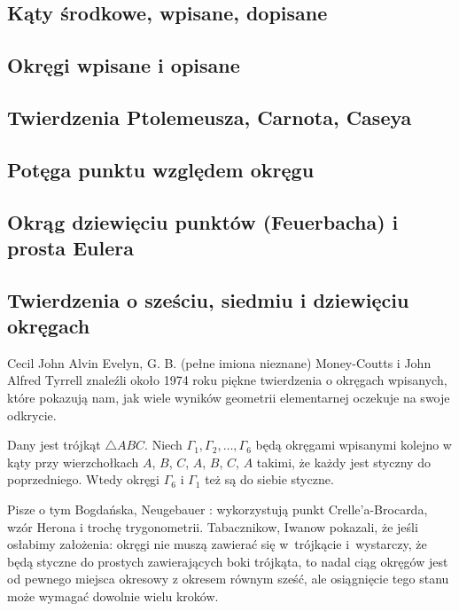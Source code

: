 \subsection{Kąty środkowe, wpisane, dopisane}


\subsection{Okręgi wpisane i opisane}


\subsection{Twierdzenia Ptolemeusza, Carnota, Caseya}


%
\subsection{Potęga punktu względem okręgu}

%

\subsection{Okrąg dziewięciu punktów (Feuerbacha) i prosta Eulera}


\subsection{Twierdzenia o sześciu, siedmiu i dziewięciu okręgach}
\label{sssection_6_7_9_circles}
Cecil John Alvin Evelyn, G. B. (pełne imiona nieznane) Money-Coutts i John Alfred Tyrrell znaleźli około 1974 roku piękne twierdzenia o okręgach wpisanych, które pokazują nam, jak wiele wyników geometrii elementarnej oczekuje na swoje odkrycie.

\begin{proposition}
%
	Dany jest trójkąt $\triangle ABC$.
	Niech $\Gamma_1, \Gamma_2, \ldots, \Gamma_6$ będą okręgami wpisanymi kolejno w kąty przy wierzchołkach $A$, $B$, $C$, $A$, $B$, $C$, $A$ takimi, że każdy jest styczny do poprzedniego.
	Wtedy okręgi $\Gamma_6$ i $\Gamma_1$ też są do siebie styczne.
\end{proposition}

Pisze o tym Bogdańska, Neugebauer \cite[s. 101]{neugebauer_2018}: wykorzystują punkt Crelle'a-Brocarda, wzór Herona i trochę trygonometrii.
Tabacznikow, Iwanow \cite{ivanov_tabachnikov_2016} pokazali, że jeśli osłabimy założenia: okręgi nie muszą zawierać się w~trójkącie i~wystarczy, że będą styczne do prostych zawierających boki trójkąta, to nadal ciąg okręgów jest od pewnego miejsca okresowy z okresem równym sześć, ale osiągnięcie tego stanu może wymagać dowolnie wielu kroków.
%
%


